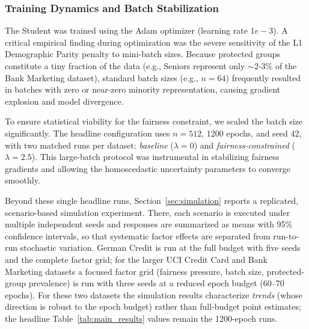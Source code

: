 \documentclass{wscpaperproc}
\theoremstyle{wsc}
\begin{document}
\subsubsection{Training Dynamics and Batch Stabilization} 
The Student was trained using the Adam optimizer (learning rate $1e-3$). A critical empirical finding during optimization was the severe sensitivity of the L1 Demographic Parity penalty to mini-batch sizes. Because protected groups constitute a tiny fraction of the data (e.g., Seniors represent only $\sim$2-3\% of the Bank Marketing dataset), standard batch sizes (e.g., $n=64$) frequently resulted in batches with zero or near-zero minority representation, causing gradient explosion and model divergence. 

To ensure statistical viability for the fairness constraint, we scaled the batch size significantly. The headline configuration uses $n=512$, 1200 epochs, and seed 42, with two matched runs per dataset: \textit{baseline} ($\lambda=0$) and \textit{fairness-constrained} ($\lambda=2.5$). This large-batch protocol was instrumental in stabilizing fairness gradients and allowing the homoscedastic uncertainty parameters to converge smoothly.

Beyond these single headline runs, Section~\ref{sec:simulation} reports a replicated, scenario-based simulation experiment. There, each scenario is executed under multiple independent seeds and responses are summarized as means with 95\% confidence intervals, so that systematic factor effects are separated from run-to-run stochastic variation. German Credit is run at the full budget with five seeds and the complete factor grid; for the larger UCI Credit Card and Bank Marketing datasets a focused factor grid (fairness pressure, batch size, protected-group prevalence) is run with three seeds at a reduced epoch budget (60--70 epochs). For these two datasets the simulation results characterize \emph{trends} (whose direction is robust to the epoch budget) rather than full-budget point estimates; the headline Table~\ref{tab:main_results} values remain the 1200-epoch runs.
\end{document}
